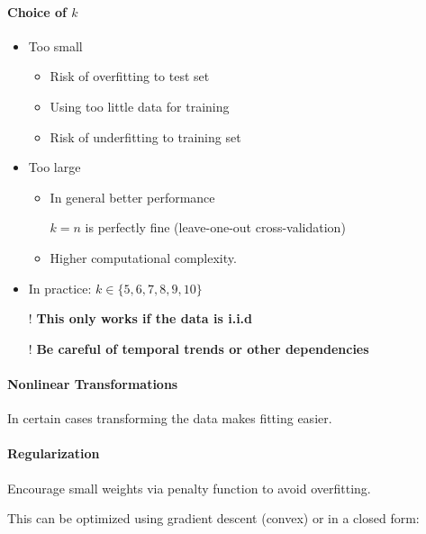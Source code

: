 \documentclass[8pt,a4paper]{scrartcl}
\begin{document}
\begin{multicols*}{3}
\paragraph{Choice of $k$}

\begin{itemize}
\ncompaq
\item Too small
\begin{itemize}
\ncompaq
\item Risk of overfitting to test set
\item Using too little data for training
\item Risk of underfitting to training set
\end{itemize}
\item Too large
\begin{itemize}
\ncompaq
\item In general better performance

$k=n$ is perfectly fine (leave-one-out cross-validation)
\item Higher computational complexity.
\end{itemize}
\item In practice: $k\in\{5,6,7,8,9,10\}$
\item[!] \textbf{This only works if the data is i.i.d}
\item[!] \textbf{Be careful of temporal trends or other dependencies}
\end{itemize}

\paragraph{Nonlinear Transformations}

In certain cases transforming the data makes fitting easier.


\paragraph{Regularization}

Encourage small weights via penalty function to avoid overfitting.


This can be optimized using gradient descent (convex) or in a closed form:


\end{multicols*}
\end{document}
